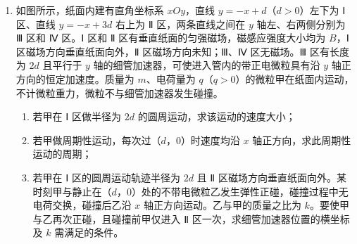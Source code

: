 \documentclass[\gkver]{gaokaozhenti}
\begin{document}
\begin{enumerate}
{最大静摩擦力等于滑动摩擦力，即 $f = \mu N = 2\mu mg$

（2）当导体棒速度最大时，安培力等于最大静摩擦力，此时 U 形框即将滑动，导体棒切割磁感线产生的感应电动势 $E = Blv_{m}$

感应电流 $I = \frac{E}{R} = \frac{Blv_{m}}{R}$

安培力 $F_{\mathrm{A}} = BIl = \frac{B^{2}l^{2}v_{m}}{R}$

根据平衡条件有 $F_{\mathrm{A}} = f = 2\mu mg$

解得 $v_{m} = \frac{2\mu mgR}{B^{2}l^{2}}$

（3）设 U 形框的速度为 $u$，则导体棒与 U 形框的相对速度为 $v - u$，导体棒感应电动势 $E = Bl(v - u)$

感应电流 $I = \frac{Bl(v - u)}{R}$

导体棒受到的安培力 $F_{\mathrm{A}}' = \frac{B^{2}l^{2}(v - u)}{R}$

导体棒受到的安培力与 U 形框受到的安培力大小相等，对 U 形框受力分析有

$F_{\mathrm{A}}' = kx_{0} + 2\mu mg$

联立解得 $u = v - \frac{(kx_{0} + 2\mu mg)R}{B^{2}l^{2}}$

导体棒做匀速运动，对导体棒，根据平衡条件可得外力 $F = F_{\mathrm{A}}' = kx_{0} + 2\mu mg$

此时外力 $F$ 的功率 $P = Fv = (kx_{0} + 2\mu mg)v$
}
\item
如图所示，纸面内建有直角坐标系 $xOy$，直线 $y = -x + d$（$d > 0$）左下为 Ⅰ 区、直线 $y = -x + 3d$ 右上为 Ⅱ 区，两条直线之间在 $y$ 轴左、右两侧分别为 Ⅲ 区和 Ⅳ 区。Ⅰ 区和 Ⅱ 区有垂直纸面的匀强磁场，磁感应强度大小均为 $B$，Ⅰ 区磁场方向垂直纸面向外，Ⅱ 区磁场方向未知；Ⅲ、Ⅳ 区无磁场。Ⅲ 区有长度为 $2d$ 且平行于 $y$ 轴的细管加速器，可使进入管内的带正电微粒具有沿 $y$ 轴正方向的恒定加速度。质量为 $m$、电荷量为 $q$（$q > 0$）的微粒甲在纸面内运动，不计微粒重力，微粒不与细管加速器发生碰撞。
\begin{enumerate}
\item
若甲在 Ⅰ 区做半径为 $2d$ 的圆周运动，求该运动的速度大小；
\item
若甲做周期性运动，每次过（$d$，$0$）时速度均沿 $x$ 轴正方向，求此周期性运动的周期；
\item
若甲在 Ⅰ 区的圆周运动轨迹半径为 $2d$ 且 Ⅱ 区磁场方向垂直纸面向外。某时刻甲与静止在（$d$，$0$）处的不带电微粒乙发生弹性正碰，碰撞过程中无电荷交换，碰撞后乙沿 $x$ 轴正方向运动。乙与甲的质量之比为 $k$。要使甲与乙再次正碰，且碰撞前甲仅进入 Ⅱ 区一次，求细管加速器位置的横坐标及 $k$ 需满足的条件。
\end{enumerate}
\onepicture[align=right, w=5.63cm]{}


\end{enumerate}
\end{document}
